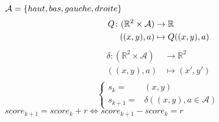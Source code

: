 \documentclass{article}
\begin{document}
\begin{math}
\mathcal{A} = \{ haut , bas , gauche, droite \}\\
\end{math}
\begin{align*}
\mathnormal{Q} \colon ( \mathbb{R}^{2} \times \mathcal{A} ) &\to \mathbb{R}\\
((x,y),a) &\mapsto \mathnormal{Q}((x,y),a)\\ 
\end{align*}
\begin{align*} 
\delta \colon ( \mathbb{R}^{2} \times \mathcal{A} ) &\to \mathbb{R}^{2}\\
((x,y),a) &\mapsto (x',y')\\ 
\end{align*}
\[ \begin{cases} 
      s_{k}= & (x,y)\\
      s_{k+1}= & \delta ((x,y),a \in \mathcal{A})
   \end{cases}
\]
\begin{math}
score_{k+1}=score_{k}+r \Leftrightarrow score_{k+1}-score_{k}=r
\end{math}
\end{document}
